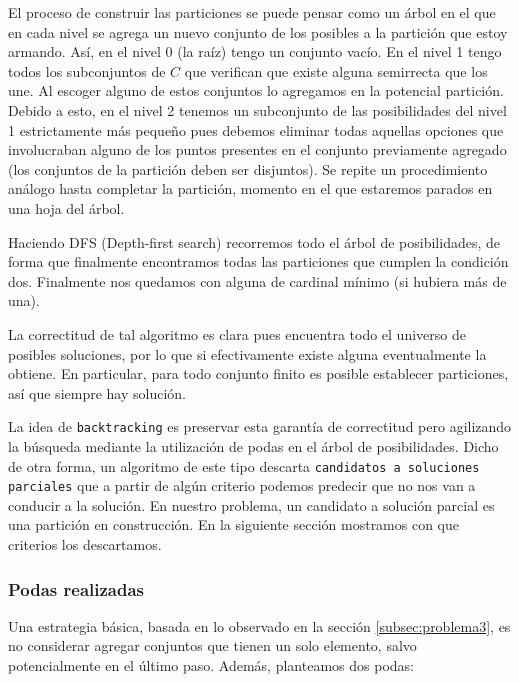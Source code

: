 El proceso de construir las particiones se puede pensar como un árbol en el que en cada nivel se agrega un nuevo conjunto de los posibles a la partición que estoy armando. Así, en el nivel 0 (la raíz) tengo un conjunto vacío. En el nivel 1 tengo todos los subconjuntos de $C$ que verifican que existe alguna semirrecta que los une. Al escoger alguno de estos conjuntos lo agregamos en la potencial partición. Debido a esto, en el nivel 2 tenemos un subconjunto de las posibilidades del nivel 1 estrictamente más pequeño pues debemos eliminar todas aquellas opciones que involucraban alguno de los puntos presentes en el conjunto previamente agregado (los conjuntos de la partición deben ser disjuntos). Se repite un procedimiento análogo hasta completar la partición, momento en el que estaremos parados en una hoja del árbol. 

Haciendo DFS (Depth-first search) recorremos todo el árbol de posibilidades, de forma que finalmente encontramos todas las particiones que cumplen la condición dos. Finalmente nos quedamos con alguna de cardinal mínimo (si hubiera más de una).

La correctitud de tal algoritmo es clara pues encuentra todo el universo de posibles soluciones, por lo que si efectivamente existe alguna eventualmente la obtiene. En particular, para todo conjunto finito es posible establecer particiones, así que siempre hay solución. 

La idea de \texttt{backtracking} es preservar esta garantía de correctitud pero agilizando la búsqueda mediante la utilización de podas en el árbol de posibilidades. Dicho de otra forma, un algoritmo de este tipo descarta \texttt{candidatos a soluciones parciales} que a partir de algún criterio podemos predecir que no nos van a conducir a la solución. En nuestro problema, un candidato a solución parcial es una partición en construcción. En la siguiente sección mostramos con que criterios los descartamos.

\subsubsection{Podas realizadas}
Una estrategia básica, basada en lo observado en la sección \ref{subsec:problema3}, es no considerar agregar conjuntos que tienen un solo elemento, salvo potencialmente en el último paso. Además, planteamos dos podas:

